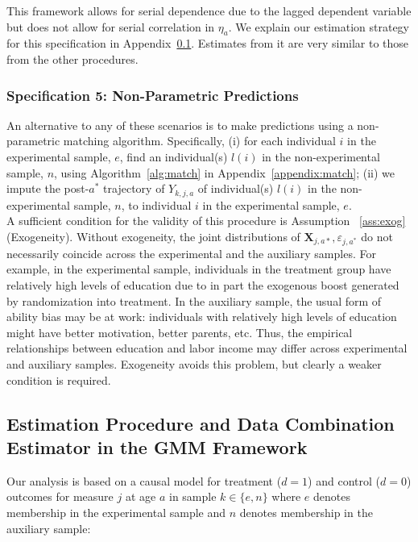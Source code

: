 \noindent This framework allows for serial dependence due to the lagged dependent variable but does not allow for serial correlation in $\eta_{a}$. We explain our estimation strategy for this specification in Appendix~\ref{appendix:gmm}. Estimates from it are very similar to those from the other procedures.

\subsubsection{Specification 5: Non-Parametric Predictions}

\noindent An alternative to any of these scenarios is to make predictions using a non-parametric matching algorithm. Specifically, (i) for each individual $i$ in the experimental sample, $e$, find an individual(s) $l(i)$ in the non-experimental sample, $n$, using Algorithm~\ref{alg:match} in Appendix~\ref{appendix:match}; (ii) we impute the post-$a^*$ trajectory of $Y_{k,j,a}$ of individual(s) $l(i)$ in the non-experimental sample, $n$, to individual $i$ in the experimental sample, $e$.\\

\noindent A sufficient condition for the validity of this procedure is Assumption ~\ref{ass:exog} (Exogeneity). Without exogeneity, the joint distributions of $\bm{X}_{j,a*}, \varepsilon_{j,a^*}$ do not necessarily coincide across the experimental and the auxiliary samples. For example, in the experimental sample, individuals in the treatment group have relatively high levels of education due to in part the exogenous boost generated by randomization into treatment. In the auxiliary sample, the usual form of ability bias may be at work: individuals with relatively high levels of education might have better motivation, better parents, etc. Thus, the empirical relationships between education and labor income may differ across experimental and auxiliary samples. Exogeneity avoids this problem, but clearly a weaker condition is required.\\


\subsection{Estimation Procedure and Data Combination Estimator in the GMM Framework} \label{appendix:gmm}

\noindent Our analysis is based on a causal model for treatment ($d=1$) and control ($d=0$) outcomes for measure $j$ at age $a$ in sample $k \in \{e,n\}$ where $e$ denotes membership in the experimental sample and $n$ denotes membership in the auxiliary sample:\\

